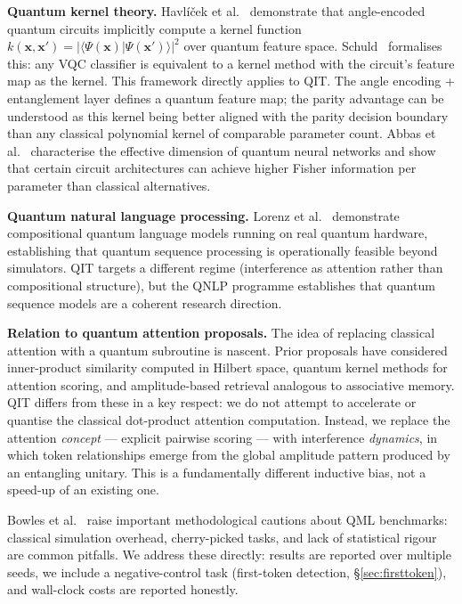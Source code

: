 \documentclass[11pt,a4paper]{article}
\begin{document}
\textbf{Quantum kernel theory.} Havl\'{i}\v{c}ek et al.~\cite{havlicek2019supervised}
demonstrate that angle-encoded quantum circuits implicitly compute a kernel function
$k(\mathbf{x}, \mathbf{x}') = |\langle \Psi(\mathbf{x}) | \Psi(\mathbf{x}') \rangle|^2$
over quantum feature space. Schuld~\cite{schuld2021kernel} formalises this: any VQC
classifier is equivalent to a kernel method with the circuit's feature map as the kernel.
This framework directly applies to QIT. The angle encoding + entanglement layer defines
a quantum feature map; the parity advantage can be understood as this kernel being better
aligned with the parity decision boundary than any classical polynomial kernel of
comparable parameter count. Abbas et al.~\cite{abbas2021power} characterise the
effective dimension of quantum neural networks and show that certain circuit architectures
can achieve higher Fisher information per parameter than classical alternatives.

\textbf{Quantum natural language processing.} Lorenz et al.~\cite{lorenz2023qnlp}
demonstrate compositional quantum language models running on real quantum hardware,
establishing that quantum sequence processing is operationally feasible beyond simulators.
QIT targets a different regime (interference as attention rather than compositional
structure), but the QNLP programme establishes that quantum sequence models are a
coherent research direction.

\textbf{Relation to quantum attention proposals.} The idea of replacing classical attention
with a quantum subroutine is nascent. Prior proposals have considered inner-product
similarity computed in Hilbert space, quantum kernel methods for attention scoring, and
amplitude-based retrieval analogous to associative memory. QIT differs from these in a
key respect: we do not attempt to accelerate or quantise the classical dot-product attention
computation. Instead, we replace the attention \emph{concept} --- explicit pairwise scoring ---
with interference \emph{dynamics}, in which token relationships emerge from the global
amplitude pattern produced by an entangling unitary. This is a fundamentally different
inductive bias, not a speed-up of an existing one.

Bowles et al.~\cite{bowles2024benchmarking} raise important methodological cautions
about QML benchmarks: classical simulation overhead, cherry-picked tasks, and lack of
statistical rigour are common pitfalls. We address these directly: results are reported
over multiple seeds, we include a negative-control task (first-token detection,
\S\ref{sec:firsttoken}), and wall-clock costs are reported honestly.
\end{document}
